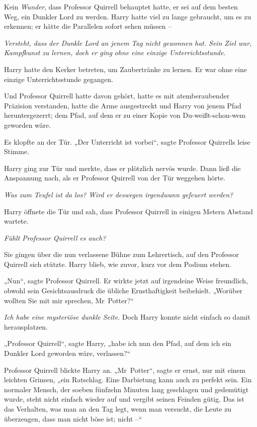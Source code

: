 {Kein \emph{Wunder}, dass Professor Quirrell behauptet hatte, er sei auf dem besten Weg, ein Dunkler Lord zu werden. Harry hatte viel zu lange gebraucht, um es zu erkennen; er hätte die Parallelen sofort sehen müssen --

\emph{Versteht, dass der Dunkle Lord an jenem Tag nicht gewonnen hat. Sein Ziel war, Kampfkunst zu lernen, doch er ging ohne eine einzige Unterrichtsstunde.}

Harry hatte den Kerker betreten, um Zaubertränke zu lernen. Er war ohne eine einzige Unterrichtsstunde gegangen.

Und Professor Quirrell hatte davon gehört, hatte es mit atemberaubender Präzision verstanden, hatte die Arme ausgestreckt und Harry von jenem Pfad heruntergezerrt; dem Pfad, auf dem er zu einer Kopie von Du-weißt-schon-wem geworden wäre.

Es klopfte an der Tür. „Der Unterricht ist vorbei“, sagte Professor Quirrells leise Stimme.

Harry ging zur Tür und merkte, dass er plötzlich nervös wurde. Dann ließ die Anspannung nach, als er Professor Quirrell von der Tür weggehen hörte.

\emph{Was zum Teufel ist da los? Wird er deswegen irgendwann gefeuert werden?}

Harry öffnete die Tür und sah, dass Professor Quirrell in einigen Metern Abstand wartete.

\emph{Fühlt Professor Quirrell es auch?}

Sie gingen über die nun verlassene Bühne zum Lehrertisch, auf den Professor Quirrell sich stützte. Harry blieb, wie zuvor, kurz vor dem Podium stehen.

„Nun“, sagte Professor Quirrell. Er wirkte jetzt auf irgendeine Weise freundlich, obwohl sein Gesichtsausdruck die übliche Ernsthaftigkeit beibehielt. „Worüber wollten Sie mit mir sprechen, Mr~Potter?“

\emph{Ich habe eine mysteriöse dunkle Seite.} Doch Harry konnte nicht einfach so damit herausplatzen.

„Professor Quirrell“, sagte Harry, „habe ich nun den Pfad, auf dem ich ein Dunkler Lord geworden wäre, verlassen?“

Professor Quirrell blickte Harry an. „Mr~Potter“, sagte er ernst, nur mit einem leichten Grinsen, „ein Ratschlag. Eine Darbietung kann auch zu perfekt sein. Ein normaler Mensch, der soeben fünfzehn Minuten lang geschlagen und gedemütigt wurde, steht nicht einfach wieder auf und vergibt seinen Feinden gütig. Das ist das Verhalten, was man an den Tag legt, wenn man versucht, die Leute zu überzeugen, dass man nicht böse ist; nicht --“

}
